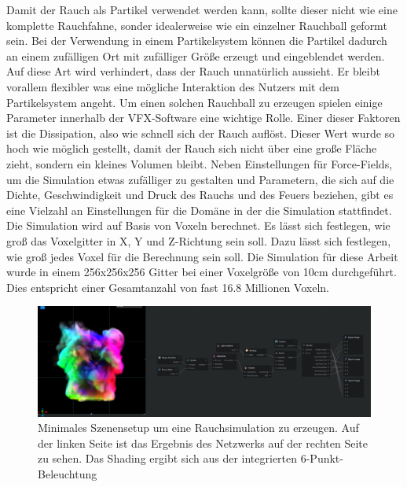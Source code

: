 Damit der Rauch als Partikel verwendet werden kann, sollte dieser nicht wie eine komplette Rauchfahne, sonder idealerweise wie ein einzelner Rauchball geformt sein.
Bei der Verwendung in einem Partikelsystem können die Partikel dadurch an einem zufälligen Ort mit zufälliger Größe erzeugt und eingeblendet werden. Auf diese
Art wird verhindert, dass der Rauch unnatürlich aussieht. Er bleibt vorallem flexibler was eine mögliche Interaktion des Nutzers mit dem Partikelsystem angeht.
Um einen solchen Rauchball zu erzeugen spielen einige Parameter innerhalb der VFX-Software eine wichtige Rolle. Einer dieser Faktoren ist die Dissipation, also
wie schnell sich der Rauch auflöst. Dieser Wert wurde so hoch wie möglich gestellt, damit der Rauch sich nicht über eine große Fläche zieht, sondern ein kleines Volumen
bleibt. Neben Einstellungen für Force-Fields, um die Simulation etwas zufälliger zu gestalten und Parametern, die sich auf die Dichte, Geschwindigkeit und Druck des Rauchs
und des Feuers beziehen, gibt es eine Vielzahl an Einstellungen für die Domäne in der die Simulation stattfindet. Die Simulation wird auf Basis von Voxeln berechnet.
Es lässt sich festlegen, wie groß das Voxelgitter in X, Y und Z-Richtung sein soll. Dazu lässt sich festlegen, wie groß jedes Voxel für die Berechnung sein soll.
Die Simulation für diese Arbeit wurde in einem 256x256x256 Gitter bei einer Voxelgröße von 10cm durchgeführt. Dies entspricht einer Gesamtanzahl von fast 16.8 Millionen Voxeln.

\begin{figure}[h!]
	\includegraphics[width=\textwidth]{Grafiken/Implementation/embergen.png}
	\centering
	\begin{footnotesize}
		\caption{Minimales Szenensetup um eine Rauchsimulation zu erzeugen. Auf der linken Seite ist das Ergebnis des Netzwerks auf der rechten Seite zu sehen. Das Shading ergibt sich aus der
			integrierten 6-Punkt-Beleuchtung}
		\label{fig:embergen}
	\end{footnotesize}
\end{figure}

